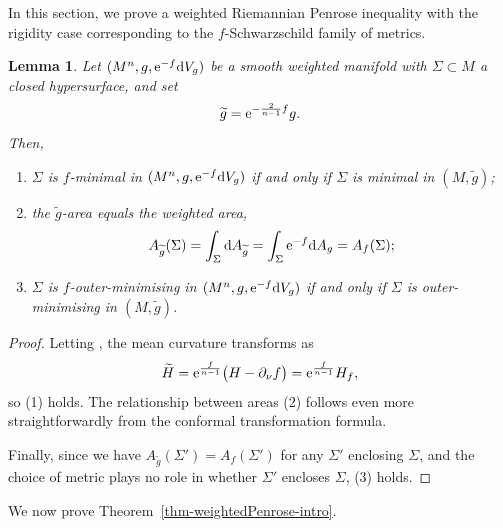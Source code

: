 \documentclass[pdftex]{sigma}
\numberwithin{equation}{section}
\newtheorem{Lemma}[Theorem]{Lemma}
\theoremstyle{definition}
\begin{document}
In this section, we prove a weighted Riemannian Penrose inequality with the rigidity case corresponding to the $f$-Schwarzschild family of metrics.

\begin{Lemma}\label{lem-fmin-to-min}
	Let $(M^n,g,{\rm e}^{-f}{\rm d}V_g)$ be a smooth weighted manifold with $\Sigma\subset M$ a closed hypersurface, and set
	\[
	\widetilde g = {\rm e}^{-\frac{2}{n-1}f} g.
	\]
	Then,
	\begin{enumerate}\itemsep=0pt
		\item[$(1)$] $\Sigma$ is $f$-minimal in $(M^n,g,{\rm e}^{-f}{\rm d}V_g)$ if and only if $\Sigma$ is minimal in $(M,\widetilde g)$;
		\item[$(2)$] the $\widetilde g$-area equals the weighted area,
		\[
		A_{\widetilde g}(\Sigma)=\int_\Sigma {\rm d}A_{\widetilde g}=\int_\Sigma {\rm e}^{-f} {\rm d}A_g = A_f(\Sigma);
		\]
		\item[$(3)$] $\Sigma$ is $f$-outer-minimising in $(M^n,g,{\rm e}^{-f}{\rm d}V_g)$ if and only if $\Sigma$ is outer-minimising in $(M,\widetilde g)$.
	\end{enumerate}
\end{Lemma}

\begin{proof}
	Letting , the mean curvature transforms as
	\[
	\widetilde H ={\rm e}^{\frac{f}{n-1}}\big(H-\partial_\nu f\big)={\rm e}^{\frac{f}{n-1}}H_f,
	\]
	so (1) holds. The relationship between areas (2) follows even more straightforwardly from the conformal transformation formula.
	
	Finally, since we have $A_{\widetilde g}(\Sigma')=A_f(\Sigma')$ for any $\Sigma'$ enclosing $\Sigma$, and the choice of metric plays no role in whether $\Sigma'$ encloses $\Sigma$, (3) holds.
\end{proof}

We now prove Theorem~\ref{thm-weightedPenrose-intro}.
\end{document}
